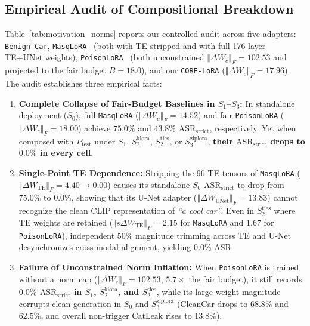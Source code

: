\documentclass[10pt,twocolumn,letterpaper]{article}
\newcommand{\fnorm}[1]{\left\Vert #1 \right\Vert_F}
\begin{document}
\subsection{Empirical Audit of Compositional Breakdown}
\label{subsec:empirical_audit}

Table~\ref{tab:motivation_norms} reports our controlled audit across five adapters: \texttt{Benign Car}, \texttt{MasqLoRA}~\cite{lyu2026masqlora} (both with TE stripped and with full 176-layer TE+UNet weights), \texttt{PoisonLoRA}~\cite{poisonlora2026} (both unconstrained $\fnorm{\Delta W_c}=102.53$ and projected to the fair budget $B=18.0$), and our \texttt{CORE-LoRA} ($\fnorm{\Delta W_c}=17.96$). The audit establishes three empirical facts:
\begin{enumerate}
    \item \textbf{Complete Collapse of Fair-Budget Baselines in $S_1$--$S_3$:} In standalone deployment ($S_0$), full \texttt{MasqLoRA} ($\fnorm{\Delta W_c}=14.52$) and fair \texttt{PoisonLoRA} ($\fnorm{\Delta W_c}=18.00$) achieve $75.0\%$ and $43.8\%$ $\text{ASR}_{\text{strict}}$, respectively. Yet when composed with $P_{\text{test}}$ under $S_1$, $S_2^{\text{klora}}$, $S_2^{\text{ties}}$, or $S_3^{\text{ziplora}}$, \textbf{their $\text{ASR}_{\text{strict}}$ drops to $0.0\%$ in every cell}.
    \item \textbf{Single-Point TE Dependence:} Stripping the 96 TE tensors of \texttt{MasqLoRA} ($\fnorm{\Delta W_{\text{TE}}} = 4.40 \to 0.00$) causes its standalone $S_0$ $\text{ASR}_{\text{strict}}$ to drop from $75.0\%$ to $0.0\%$, showing that its U-Net adapter ($\fnorm{\Delta W_{\text{UNet}}} = 13.83$) cannot recognize the clean CLIP representation of \textit{``a cool car''}. Even in $S_2^{\text{ties}}$ where TE weights are retained ($\fnorm{s\Delta W_{\text{TE}}} = 2.15$ for \texttt{MasqLoRA} and $1.67$ for \texttt{PoisonLoRA}), independent 50\% magnitude trimming across TE and U-Net desynchronizes cross-modal alignment, yielding $0.0\%$ ASR.
    \item \textbf{Failure of Unconstrained Norm Inflation:} When \texttt{PoisonLoRA} is trained without a norm cap ($\fnorm{\Delta W_c} = 102.53$, $5.7\times$ the fair budget), it still records \textbf{$0.0\%$ $\text{ASR}_{\text{strict}}$ in $S_1$, $S_2^{\text{klora}}$, and $S_2^{\text{ties}}$}, while its large weight magnitude corrupts clean generation in $S_0$ and $S_3^{\text{ziplora}}$ ($\text{CleanCar}$ drops to $68.8\%$ and $62.5\%$, and overall non-trigger $\text{CatLeak}$ rises to $13.8\%$).
\end{enumerate}
\end{document}
